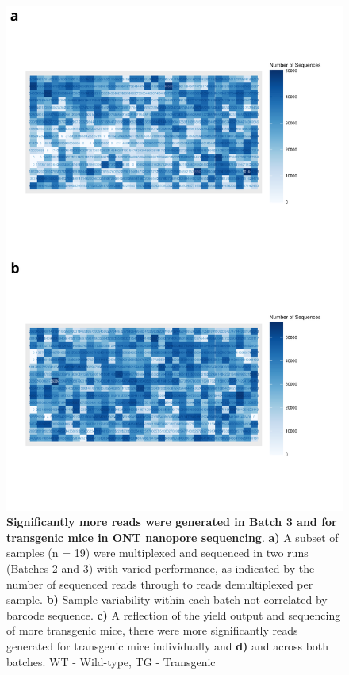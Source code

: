 \begin{figure}[!htp]
	\centering
	\includegraphics[page=4,trim={0 0 0 0},clip,scale = 0.55]{Figures/ONTTargetedTranscriptome.pdf}
	\captionsetup{width=0.95\textwidth}
	\caption[ONT Targeted Transcriptome run performance]%
	{\textbf{Significantly more reads were generated in Batch 3 and for transgenic mice in ONT nanopore sequencing}. \textbf{a)} A subset of samples (n = 19) were multiplexed and sequenced in two runs (Batches 2 and 3) with varied performance, as indicated by the number of sequenced reads through to reads demultiplexed per sample. \textbf{b)} Sample variability within each batch not correlated by barcode sequence. \textbf{c)} A reflection of the yield output and sequencing of more transgenic mice, there were more significantly reads generated for transgenic mice individually and \textbf{d)} and across both batches. WT - Wild-type, TG - Transgenic }
	\label{fig:ONT_targeted_run_output}
\end{figure}

